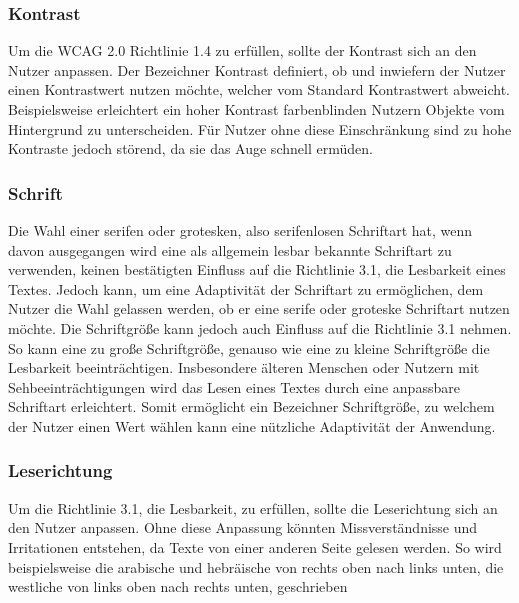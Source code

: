 \documentclass[12pt, paper=a4, bibtotoc, toc=listof, headsepline=true]{scrreprt}
\begin{document}
			\subsubsection{Kontrast}
			Um die \ac{WCAG 2.0} Richtlinie 1.4 zu erfüllen, sollte der Kontrast sich an den Nutzer anpassen. Der Bezeichner Kontrast definiert, ob und inwiefern der Nutzer einen Kontrastwert nutzen möchte, welcher vom Standard Kontrastwert abweicht. Beispielsweise erleichtert ein hoher Kontrast farbenblinden Nutzern Objekte vom Hintergrund zu unterscheiden. Für Nutzer ohne diese Einschränkung sind zu hohe Kontraste jedoch störend, da sie das Auge schnell ermüden.\cite[vgl S.234]{balzert2009webdesign}
			\subsubsection{Schrift}
			Die Wahl einer serifen oder grotesken, also serifenlosen Schriftart hat, wenn davon ausgegangen wird eine als allgemein lesbar bekannte Schriftart zu verwenden, keinen bestätigten Einfluss auf die Richtlinie 3.1, die Lesbarkeit eines Textes.\cite[vgl. S.157-161]{barrierefreiheit} Jedoch kann, um eine Adaptivität der Schriftart zu ermöglichen, dem Nutzer die Wahl gelassen werden, ob er eine serife oder groteske Schriftart nutzen möchte.
			Die Schriftgröße kann jedoch auch Einfluss auf die Richtlinie 3.1 nehmen. So kann eine zu große Schriftgröße, genauso wie eine zu kleine Schriftgröße die Lesbarkeit beeinträchtigen. Insbesondere älteren Menschen oder Nutzern mit Sehbeeinträchtigungen wird das Lesen eines Textes durch eine anpassbare Schriftart erleichtert.\cite[vgl. S.152]{barrierefreiheit} Somit ermöglicht ein Bezeichner Schriftgröße, zu welchem der Nutzer einen Wert wählen kann eine nützliche Adaptivität der Anwendung. 
			\subsubsection{Leserichtung}
			\label{ref:lesRic}
			Um die Richtlinie 3.1, die Lesbarkeit, zu erfüllen, sollte die Leserichtung sich an den Nutzer anpassen. Ohne diese Anpassung könnten Missverständnisse und Irritationen entstehen, da Texte von einer anderen Seite gelesen werden. So wird beispielsweise die arabische und hebräische von rechts oben nach links unten, die westliche von links oben nach rechts unten, geschrieben  \cite[vgl S.148]{emrich2013interkulturelles}
\end{document}

